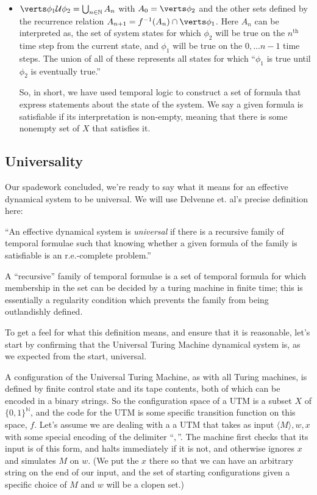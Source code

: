 \documentclass{fkpaper}
\newcommand{\ltil}{\mathcal{U}}
\renewcommand{\Nn}{\mathbb{N}}
\begin{document}
\begin{multicols}{2}
\begin{itemize}
  \item $\abs{\phi_1 \ltil \phi_2} = \bigcup_{n \in \Nn} A_n$ with $A_0 = \abs{\phi_2}$ and the other sets defined by the recurrence relation $A_{n+1} = f^{-1}(A_n)\cap\abs{\phi_1}$. Here $A_n$ can be interpreted as, the set of system states for which $\phi_2$ will be true on the $n^{\text{th}}$ time step from the current state, and $\phi_1$ will be true on the $0,...n-1$ time steps. The union of all of these represents all states for which ``$\phi_1$ is true until $\phi_2$ is eventually true.''

    So, in short, we have used temporal logic to construct a set of formula that express statements about the state of the system. We say a given formula is satisfiable if its interpretation is non-empty, meaning that there is some nonempty set of $X$ that satisfies it.

\end{itemize}


\subsection{Universality}

Our spadework concluded, we're ready to say what it means for an effective dynamical system to be universal. We will use Delvenne et. al's precise definition here:

\begin{definition}[universality]

	``An effective dynamical system is \emph{universal} if there is a recursive family of temporal formulae such that knowing whether a given formula of the family is satisfiable is an r.e.-complete problem.''
\end{definition}

A ``recursive'' family of temporal formulae is a set of temporal formula for which membership in the set can be decided by a turing machine in finite time; this is essentially a regularity condition which prevents the family from being outlandishly defined.

To get a feel for what this definition means, and ensure that it is reasonable, let's start by confirming that the Universal Turing Machine dynamical system  is, as we expected from the start, universal.

A configuration of the Universal Turing Machine, as with all Turing machines, is defined by finite control state and its tape contents, both of which can be encoded in a binary strings. So the configuration space of a UTM is a subset $X$ of $\{0,1\}^\Nn$, and the code for the UTM is some specific transition function on this space, $f$. Let's assume we are dealing with a a UTM that takes as input $\langle M \rangle, w, x$ with some special encoding of the delimiter ``$,$''. The machine first checks that its input is of this form, and halts immediately if it is not, and otherwise ignores $x$ and simulates $M$ on $w$. (We put the $x$ there so that we can have an arbitrary string on the end of our input, and the set of starting configurations given a specific choice of $M$ and $w$ will be a clopen set.)


\end{multicols}
\end{document}
